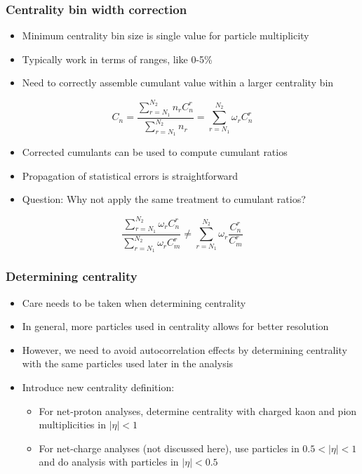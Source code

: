 \documentclass[accentcolor=tud2c,usenames,dvipsnames,colorbacktitle,inverttitle,landscape,german,presentation,t]{tudbeamer}
\begin{document}
  \begin{frame}
    \frametitle{Centrality bin width correction}
    \begin{itemize}
      \item Minimum centrality bin size is single value for particle
        multiplicity
      \item Typically work in terms of ranges, like 0-5\%
      \item Need to correctly assemble cumulant value within a larger
        centrality bin
    \end{itemize}
    \begin{equation*}
      C_n = \frac{\sum_{r=N_1}^{N_2} n_r C_{n}^{r}}{\sum_{r=N_1}^{N_2} n_r} =
      \sum_{r=N_1}^{N_2} \omega_r C_{n}^{r}
    \end{equation*}
    \begin{itemize}
      \item Corrected cumulants can be used to compute cumulant ratios
      \item Propagation of statistical errors is straightforward
      \item Question: Why not apply the same treatment to cumulant ratios?
    \end{itemize}
    \begin{equation*}
      \frac{\sum_{r=N_1}^{N_2} \omega_r C_{n}^{r}}{\sum_{r=N_1}^{N_2} \omega_r
      C_{m}^{r}} \neq
      \sum_{r=N_1}^{N_2} \omega_r \frac{C_{n}^{r}}{C_{m}^{r}}
    \end{equation*}
  \end{frame}

  \begin{frame}
    \frametitle{Determining centrality}
    \begin{itemize}
      \item Care needs to be taken when determining centrality
      \item In general, more particles used in centrality allows for better
        resolution
      \item However, we need to avoid autocorrelation effects by determining
        centrality with the same particles used later in the analysis
      \item Introduce new centrality definition:
      \begin{itemize}
        \item For net-proton analyses, determine centrality with charged kaon
          and pion multiplicities in $|\eta| < 1$
        \item For net-charge analyses (not discussed here), use particles in
          $0.5 < |\eta| < 1$ and do analysis with particles in $|\eta| < 0.5$
      \end{itemize}
    \end{itemize}
  \end{frame}
\end{document}
